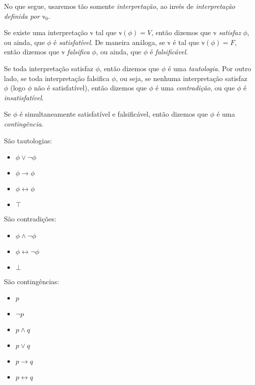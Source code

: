 No que segue, usaremos tão somente \emph{interpretação}, ao invés de \emph{interpretação definida por $\mathbb{v}_0$}.

\begin{definition}
	Se existe uma interpretação $\mathbb{v}$ tal que $\mathbb{v}(\phi) = V$, então dizemos que $\mathbb{v}$ \emph{satisfaz} $\phi$, ou ainda, que $\phi$ é \emph{satisfatível}. De maneira análoga, se $\mathbb{v}$ é tal que $\mathbb{v}(\phi) = F$, então dizemos que $\mathbb{v}$ \emph{falsifica} $\phi$, ou ainda, que $\phi$ é \emph{falsificável}.
	
	Se toda interpretação satisfaz $\phi$, então dizemos que $\phi$ é uma \emph{tautologia}. Por outro lado, se toda interpretação falsifica $\phi$, ou seja, se nenhuma interpretação satisfaz $\phi$ (logo $\phi$ não é satisfatível), então dizemos que $\phi$ é uma \emph{contradição}, ou que $\phi$ é \emph{insatisfatível}.
	
	Se $\phi$ é simultaneamente satisfatível e falsificável, então dizemos que $\phi$ é uma \emph{contingência}.
\end{definition}

\begin{example}
    São tautologias:
    \begin{itemize}
        \item $\phi \vee \neg \phi$
        \item $\phi \rightarrow \phi$
        \item $\phi \leftrightarrow \phi$
        \item $\top$
    \end{itemize}
    São contradições:
    \begin{itemize}
        \item $\phi \wedge \neg \phi$
        \item $\phi \leftrightarrow \neg \phi$
        \item $\bot$
    \end{itemize}
    São contingências:
    \begin{itemize}
    	\item $p$
    	\item $\neg p$
    	\item $p \wedge q$
    	\item $p \vee q$
    	\item $p \rightarrow q$
    	\item $p \leftrightarrow q$
    \end{itemize}
\end{example}

